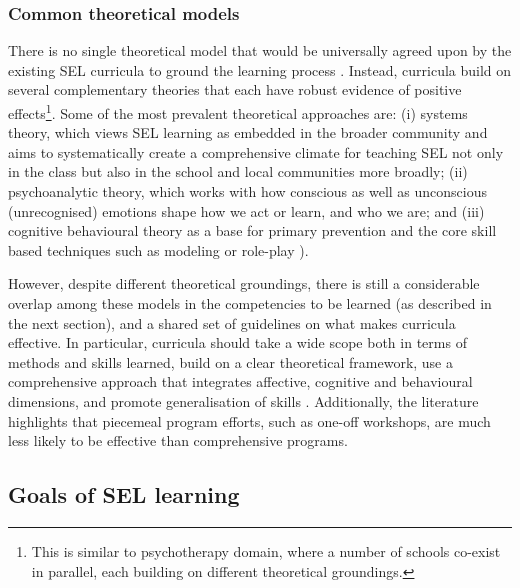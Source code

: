 \documentclass[prodmode,acmtochi]{acmsmall}
\newcommand{\todolater}[1]{}
\begin{document}
\subsubsection{Common theoretical models}
There is no single theoretical model that would be universally agreed upon by the existing SEL curricula to ground the learning process \cite{Payton2000}. Instead, curricula build on several complementary theories that each have robust evidence of positive effects\footnote{This is similar to psychotherapy domain, where a number of schools co-exist in parallel, each building on different theoretical groundings.}. 
Some of the most prevalent theoretical approaches are: (i) systems theory, which views SEL learning as embedded in the broader community and aims to systematically create a comprehensive climate for teaching SEL not only in the class but also in the school and local communities more broadly; (ii) psychoanalytic theory, which works with how conscious as well as unconscious (unrecognised) emotions shape how we act or learn, and who we are; and (iii) cognitive behavioural theory as a base for primary prevention and the core skill based techniques such as modeling or role-play \cite[p.65]{Maree2007}).

However, despite different theoretical groundings, there is still a considerable overlap among these models in the competencies to be learned (as described in the next section), and a shared set of guidelines on what makes curricula effective. In particular, curricula should take a wide scope both in terms of methods and skills learned, build on a clear theoretical framework, use a comprehensive approach that integrates affective, cognitive and behavioural dimensions, and promote generalisation of skills \cite[p.119]{Elias1997}. Additionally, the literature highlights that piecemeal program efforts, such as one-off workshops, are much less likely to be effective \cite[p.13]{Zins2004} than comprehensive programs.


\todolater{Outline the theoretical background of PATHS, Incredible Years and RULER. What does this mean for technology?}







\subsection{Goals of SEL learning}
\label{sec:blocks}
\end{document}
